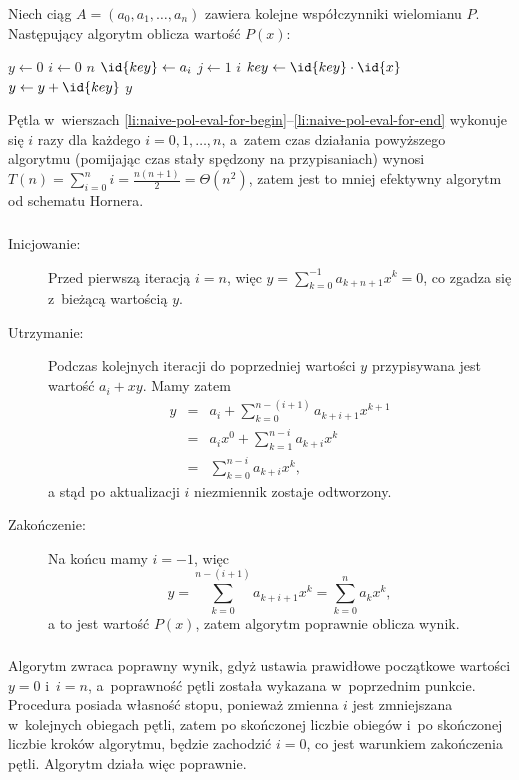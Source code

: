 \subsubsection{} %
Niech ciąg $A=(a_0,a_1,\dots,a_n)$ zawiera kolejne współczynniki wielomianu $P$. Następujący algorytm oblicza wartość $P(x)$:
\begin{codebox}
\li	$y\gets 0$
\li	\For $i\gets 0$ \To $n$
\li		\Do
			$\id{key}\gets a_i$
\li			\For $j\gets 1$ \To $i$ \label{li:naive-pol-eval-for-begin}
\li				\Do
					$key\gets \id{key}\cdot\id{x}$
				\End \label{li:naive-pol-eval-for-end}
\li			$y\gets y+\id{key}$
		\End
\li	\Return $y$
\end{codebox}
Pętla  w~wierszach \ref{li:naive-pol-eval-for-begin}--\ref{li:naive-pol-eval-for-end} wykonuje się $i$ razy dla każdego $i=0,1,\dots,n$, a~zatem czas działania powyższego algorytmu (pomijając czas stały spędzony na przypisaniach) wynosi $T(n)=\sum_{i=0}^ni=\frac{n(n+1)}{2}=\Theta(n^2)$, zatem jest to mniej efektywny algorytm od schematu Hornera.

\subsubsection{} %
\begin{description}
	\item[Inicjowanie:] Przed pierwszą iteracją $i=n$, więc $y=\sum_{k=0}^{-1}a_{k+n+1}x^k=0$, co zgadza się z~bieżącą wartością $y$.
	\item[Utrzymanie:] Podczas kolejnych iteracji do poprzedniej wartości $y$ przypisywana jest wartość $a_i+xy$. Mamy zatem
	\begin{eqnarray*}
		y &=& a_i+\sum_{k=0}^{n-(i+1)}a_{k+i+1}x^{k+1} \\
		&=& a_ix^0+\sum_{k=1}^{n-i}a_{k+i}x^k \\
		&=& \sum_{k=0}^{n-i}a_{k+i}x^k,
	\end{eqnarray*}
	a stąd po aktualizacji $i$ niezmiennik zostaje odtworzony.
	\item[Zakończenie:] Na końcu mamy $i=-1$, więc
	\[
		y=\sum_{k=0}^{n-(i+1)}a_{k+i+1}x^k=\sum_{k=0}^na_kx^k,
	\]
	a to jest wartość $P(x)$, zatem algorytm poprawnie oblicza wynik.
\end{description}

\subsubsection{} %
Algorytm zwraca poprawny wynik, gdyż ustawia prawidłowe początkowe wartości $y=0$ i~$i=n$, a~poprawność pętli  została wykazana w~poprzednim punkcie. Procedura posiada własność stopu, ponieważ zmienna $i$ jest zmniejszana w~kolejnych obiegach pętli, zatem po skończonej liczbie obiegów i~po skończonej liczbie kroków algorytmu, będzie zachodzić $i=0$, co jest warunkiem zakończenia pętli. Algorytm działa więc poprawnie.

